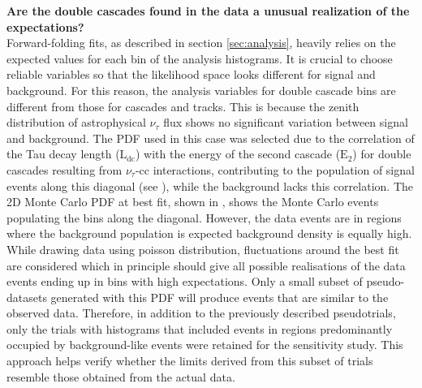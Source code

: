 \textbf{Are the double cascades found in the data a unusual realization of the expectations?}\\

Forward-folding fits, as described in section \ref{sec:analysis}, heavily relies on the expected values for each bin of the analysis histograms. It is crucial to choose reliable variables so that the likelihood space looks different for signal and background. For this reason, the analysis variables for double cascade bins are different from those for cascades and tracks. This is because the zenith distribution of astrophysical $\nu_{\tau}$ flux shows no significant variation between signal and background. The PDF used in this case was selected due to the correlation of the Tau decay length ($\mathrm{L}_{\mathrm{dc}}$) with the energy of the second cascade ($\mathrm{E}_{2}$) for double cascades resulting from $\nu_{\tau}$-cc interactions, contributing to the population of signal events along this diagonal (see ), while the background lacks this correlation. The 2D Monte Carlo PDF at best fit, shown in , shows the  Monte Carlo events populating the bins along the diagonal. However, the data events are in regions where the background population is expected background density is equally high. While drawing data using poisson distribution, fluctuations around the best fit are considered which in principle should give all possible realisations of the data events ending up in bins with high expectations. Only a small subset of pseudo-datasets generated with this PDF will produce events that are similar to the observed data. Therefore, in addition to the previously described pseudotrials, only the trials with histograms that included events in regions predominantly occupied by background-like events were retained for the sensitivity study. This approach helps verify whether the limits derived from this subset of trials resemble those obtained from the actual data.
